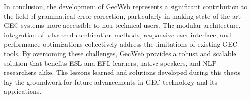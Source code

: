 In conclusion, the development of GecWeb represents a significant contribution to the field of grammatical error correction, particularly in making state-of-the-art GEC systems more accessible to non-technical users.
The modular architecture, integration of advanced combination methods, responsive user interface, and performance optimizations collectively address the limitations of existing GEC tools.
By overcoming these challenges, GecWeb provides a robust and scalable solution that benefits ESL and EFL learners, native speakers, and NLP researchers alike.
The lessons learned and solutions developed during this thesis lay the groundwork for future advancements in GEC technology and its applications.
